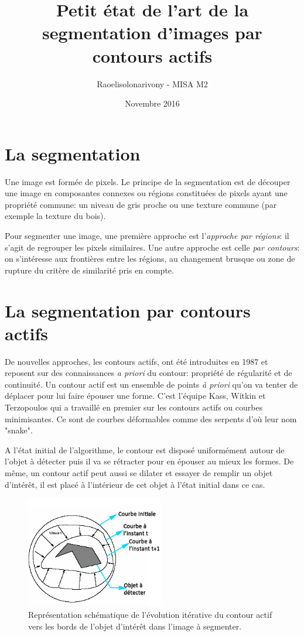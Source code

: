 \documentclass[11pt]{article}
\title{Petit état de l’art de la segmentation d’images par contours actifs}
\author{Raoelisolonarivony - MISA M2}
\date{Novembre 2016}
\begin{document}
\maketitle

\section{La segmentation}

Une image est formée de pixels. Le principe de la segmentation est de découper une image en composantes connexes ou régions constituées de pixels ayant une propriété commune: un niveau de gris proche ou une texture commune (par exemple la texture du bois).

Pour segmenter une image, une première approche est l'\textit{approche par régions}: il s'agit de regrouper les pixels similaires. Une autre approche est celle \textit{ par contours}: on s'intéresse aux frontières entre les régions, au changement brusque ou zone de rupture du critère de similarité pris en compte.

\section{La segmentation par contours actifs}

De nouvelles approches, les contours actifs, ont été introduites en 1987 et reposent sur des connaissances \textit{a priori} du contour: propriété de régularité et de continuité.
Un contour actif est un ensemble de points \textit{à priori} qu'on va tenter de déplacer pour lui faire épouser une forme.
C'est l'équipe Kass, Witkin et Terzopoulos \cite{snakes-active-contour-models} qui a travaillé en premier sur les contours actifs ou courbes minimisantes. Ce sont de courbes déformables comme des serpents d'où leur nom "snake".

A l'état initial de l'algorithme, le contour est disposé uniformément autour de l'objet à détecter puis il va se rétracter
pour en épouser au mieux les formes. De même, un contour actif peut aussi se dilater et essayer de remplir
un objet d'intérêt, il est placé à l'intérieur de cet objet à l'état initial dans ce cas.

\begin{figure}[!htbp]
\centering
\includegraphics[width=6cm]{evolutionContourActif2.jpg}
\caption{Représentation schématique de l’évolution itérative du contour actif vers les bords de l’objet d’intérêt dans l’image à segmenter.}
\label{figure:image}
\end{figure}
\end{document}
